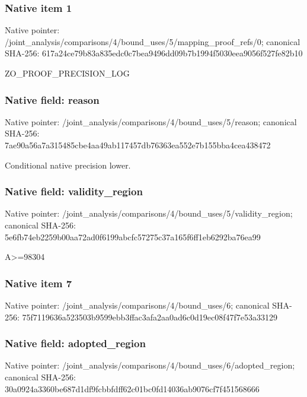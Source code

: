 \documentclass[10pt,a4paper]{article}
\begin{document}
\subsubsection{Native item 1}
Native pointer: /joint\_\allowbreak{}analysis/comparisons/4/bound\_\allowbreak{}uses/5/mapping\_\allowbreak{}proof\_\allowbreak{}refs/0; canonical SHA-256: 617a24ce79b83a835edc0c7bea9496dd09b7b1994f5030eea9056f527fe82b10

\begingroup\raggedright\sloppy ZO\_\allowbreak{}PROOF\_\allowbreak{}PRECISION\_\allowbreak{}LOG\par\endgroup

\subsubsection{Native field: reason}
Native pointer: /joint\_\allowbreak{}analysis/comparisons/4/bound\_\allowbreak{}uses/5/reason; canonical SHA-256: 7ae90a56a7a315485cbe4aa49ab117457db76363ea552e7b155bba4cea438472

\begingroup\raggedright\sloppy Conditional native precision lower.\par\endgroup

\subsubsection{Native field: validity\_\allowbreak{}region}
Native pointer: /joint\_\allowbreak{}analysis/comparisons/4/bound\_\allowbreak{}uses/5/validity\_\allowbreak{}region; canonical SHA-256: 5e6fb74eb2259b00aa72ad0f6199abcfc57275c37a165f6ff1eb6292ba76ea99

\begingroup\raggedright\sloppy A>=\allowbreak{}98304\par\endgroup

\subsubsection{Native item 7}
Native pointer: /joint\_\allowbreak{}analysis/comparisons/4/bound\_\allowbreak{}uses/6; canonical SHA-256: 75f7119636a523503b9599ebb3ffac3afa2aa0ad6c0d19ec08f47f7e53a33129

\subsubsection{Native field: adopted\_\allowbreak{}region}
Native pointer: /joint\_\allowbreak{}analysis/comparisons/4/bound\_\allowbreak{}uses/6/adopted\_\allowbreak{}region; canonical SHA-256: 30a0924a3360be687d1df9fcbbfdff62c01bc0fd14036ab9076cf7f451568666
\end{document}
